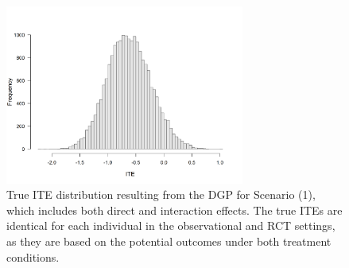 \begin{figure}[htbp]
\centering
\includegraphics[width=0.7\textwidth]{img/results/observ_scenario1_ite_distribution_dgp.png}
\caption{True ITE distribution resulting from the DGP for Scenario (1), which includes both direct and interaction effects. The true ITEs are identical for each individual in the observational and RCT settings, as they are based on the potential outcomes under both treatment conditions.}
\label{fig:scenario1_ite_distribution_dgp}
\end{figure}




